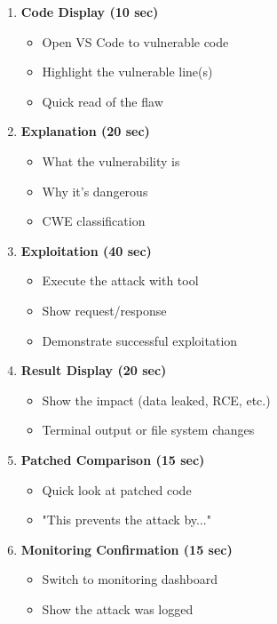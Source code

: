 \documentclass[12pt,a4paper]{article}
\begin{document}
\begin{enumerate}[leftmargin=*]
    \item \textbf{Code Display (10 sec)}
    \begin{itemize}
        \item Open VS Code to vulnerable code
        \item Highlight the vulnerable line(s)
        \item Quick read of the flaw
    \end{itemize}
    
    \item \textbf{Explanation (20 sec)}
    \begin{itemize}
        \item What the vulnerability is
        \item Why it's dangerous
        \item CWE classification
    \end{itemize}
    
    \item \textbf{Exploitation (40 sec)}
    \begin{itemize}
        \item Execute the attack with tool
        \item Show request/response
        \item Demonstrate successful exploitation
    \end{itemize}
    
    \item \textbf{Result Display (20 sec)}
    \begin{itemize}
        \item Show the impact (data leaked, RCE, etc.)
        \item Terminal output or file system changes
    \end{itemize}
    
    \item \textbf{Patched Comparison (15 sec)}
    \begin{itemize}
        \item Quick look at patched code
        \item "This prevents the attack by..."
    \end{itemize}
    
    \item \textbf{Monitoring Confirmation (15 sec)}
    \begin{itemize}
        \item Switch to monitoring dashboard
        \item Show the attack was logged
    \end{itemize}
\end{enumerate}
\end{document}
